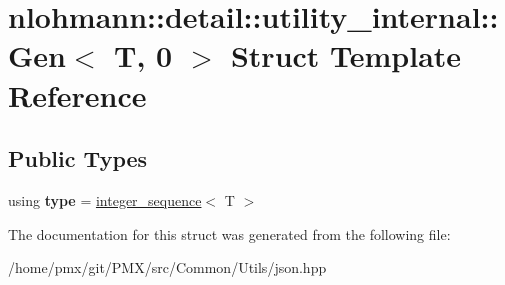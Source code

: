 \hypertarget{structnlohmann_1_1detail_1_1utility__internal_1_1Gen_3_01T_00_010_01_4}{}\section{nlohmann\+:\+:detail\+:\+:utility\+\_\+internal\+:\+:Gen$<$ T, 0 $>$ Struct Template Reference}
\label{structnlohmann_1_1detail_1_1utility__internal_1_1Gen_3_01T_00_010_01_4}
\subsection*{Public Types}
\begin{DoxyCompactItemize}
\item 
\mbox{\label{structnlohmann_1_1detail_1_1utility__internal_1_1Gen_3_01T_00_010_01_4_aa0c393a15d2fb6a2de5b93facb192f8f}} 
using {\bfseries type} = \hyperlink{structnlohmann_1_1detail_1_1integer__sequence}{integer\+\_\+sequence}$<$ T $>$
\end{DoxyCompactItemize}


The documentation for this struct was generated from the following file\+:\begin{DoxyCompactItemize}
\item 
/home/pmx/git/\+P\+M\+X/src/\+Common/\+Utils/json.\+hpp\end{DoxyCompactItemize}
